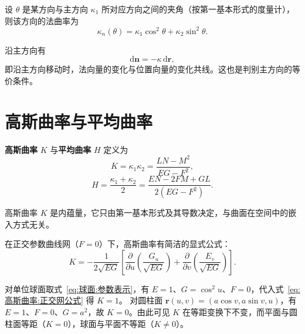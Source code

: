 \begin{theorem}[Euler 公式]
	设 $\theta$ 是某方向与主方向 $\kappa_1$ 所对应方向之间的夹角（按第一基本形式的度量计），则该方向的法曲率为
	\begin{equation}
		\kappa_{n}(\theta)=\kappa_1\cos^{2}\theta+\kappa_2\sin^{2}\theta.
		\label{eq:Euler公式}
	\end{equation}
\end{theorem}

\begin{proposition}[Rodrigues 公式]
	沿主方向有
	\begin{equation}
		\mathrm{d}\mathbf{n}=-\kappa\,\mathrm{d}\boldsymbol{r},
		\label{eq:Rodrigues:公式}
	\end{equation}
	即沿主方向移动时，法向量的变化与位置向量的变化共线。这也是判别主方向的等价条件。
\end{proposition}

\section{高斯曲率与平均曲率}

\begin{definition}[高斯曲率与平均曲率]
	\textbf{高斯曲率} $K$ 与\textbf{平均曲率} $H$ 定义为
	\begin{equation}
		K=\kappa_1\kappa_2=\frac{LN-M^{2}}{EG-F^{2}},
		\label{eq:高斯曲率:定义}
	\end{equation}
	\begin{equation}
		H=\frac{\kappa_1+\kappa_2}{2}
		=\frac{EN-2FM+GL}{2(EG-F^{2})}.
		\label{eq:平均曲率:定义}
	\end{equation}
\end{definition}

\begin{theorem}
	高斯曲率 $K$ 是内蕴量，它只由第一基本形式及其导数决定，与曲面在空间中的嵌入方式无关。
	\label{thm:高斯绝妙定理}
\end{theorem}

在正交参数曲线网（$F=0$）下，高斯曲率有简洁的显式公式：
\begin{equation}
	K=-\frac{1}{2\sqrt{EG}}\left[
		\frac{\partial}{\partial u}\left(\frac{G_u}{\sqrt{EG}}\right)
		+\frac{\partial}{\partial v}\left(\frac{E_v}{\sqrt{EG}}\right)
	\right].
	\label{eq:高斯曲率:正交网公式}
\end{equation}

\begin{example}[球面与圆柱面的高斯曲率]
	对单位球面取式~\eqref{eq:球面:参数表示}，有 $E=1$、$G=\cos^{2}u$、$F=0$，代入式~\eqref{eq:高斯曲率:正交网公式} 得 $K=1$。
	对圆柱面 $\boldsymbol{r}(u,v)=(a\cos v,a\sin v,u)$，有 $E=1$、$F=0$、$G=a^{2}$，故 $K=0$。由此可见 $K$ 在等距变换下不变，而平面与圆柱面等距（$K=0$），球面与平面不等距（$K\neq0$）。
\end{example}

